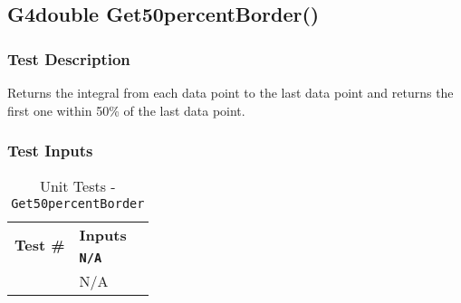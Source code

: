 \documentclass[12pt]{article}
\newcounter{TestCounter}
\begin{document}
\subsection{G4double Get50percentBorder()}%
	\subsubsection{Test Description}
	 Returns the integral from each data point to the last data point and returns the first one within 
50\% of the last data point.
	
	\subsubsection{Test Inputs}
		\begin{table}[H]
		\centering
		\caption{Unit Tests - \texttt{Get50percentBorder}}\label{Get50percentBorder_unit}
		\begin{tabular}{lll}
		\toprule
		\multirow{2}{*}{\bf Test \#}  & \multicolumn{1}{c}{\bf Inputs}\\
		& \bf \texttt{N/A}\\\midrule
		{TestCounter}\arabic{TestCounter}\label{Get50percentBorder_0} & N/A \\
		\bottomrule
		\end{tabular}
		\end{table}
\end{document}
